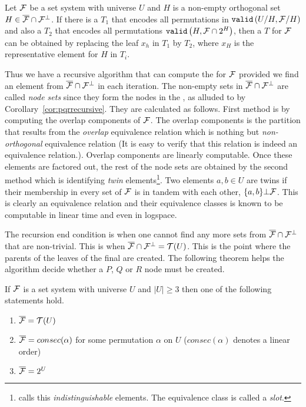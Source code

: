 \begin{corollary}[{\cite[Cor.~8]{mm96}}]
  \label{cor:pqrrecursive}
  Let ${\cal F}$ be a set system with universe $U$ and $H$ is a non-empty
  orthogonal set $H \in \overline{{\cal F}} \cap {\cal F}^{\bot}$. If there is a \PQRtree $T_1$ that
  encodes all permutations in ${\tt valid}\left(U/H, {\cal F}/H\right)$ and also a \PQRtree
  $T_2$ that encodes all permutations ${\tt valid}\left(H,{\cal F} \cap 2^{H}\right)$,
  then a \PQRtree $T$ for ${\cal F}$ can be obtained by replacing the leaf
  $x_h$ in $T_1$ by $T_2$, where $x_H$ is the representative element for
  $H$ in $T_i$.
\end{corollary}


Thus we have a recursive algorithm that can compute the \PQRtree for
${\cal F}$ provided we find an element from $\overline{{\cal F}} \cap {\cal F}^{\bot}$ in each iteration. The
non-empty sets in $\overline{{\cal F}} \cap {\cal F}^{\bot}$ are called {\em node sets} since they form the
nodes in the \PQRtree, as alluded to by
Corollary~\ref{cor:pqrrecursive}. They are calculated as follows.
First method is by computing the overlap components of ${\cal F}$. The
overlap components is the partition that results from the {\em
  overlap} equivalence relation which is nothing but {\em
  non-orthogonal} equivalence relation (It is easy to verify
  that this relation is indeed an equivalence relation.). Overlap
components are linearly computable\cite{mm95,wlh92}. Once these
elements are factored out, the rest of the node sets are obtained by
the second method which is identifying {\em twin}
elements\footnote{\cite[Sec.~3]{kklv10} calls this {\em indistinguishable}
  elements. The equivalence class is called a {\em slot}.}. Two
elements $a, b \in U$ are twins if their membership in every set of
${\cal F}$ is in tandem with each other, \ie $\{a,b\} \bot {\cal F}$. This is
clearly an equivalence relation and their equivalence classes is known
to be computable in linear time\cite{wlh01} and even in
logspace\cite{kklv10}.

The recursion end condition is when one cannot find any more sets from
$\overline{{\cal F}} \cap {\cal F}^{\bot}$ that are non-trivial. This is when $\overline{{\cal F}} \cap {\cal F}^{\bot} = {\cal T}(U)$. This is the
point where the parents of the leaves of the final \PQRtree are created. The
following theorem helps the algorithm decide whether a $P$, $Q$ or
$R$ node must be created.

\begin{theoremsansproof}[{\cite[Th.~9]{mm96}}] %
\label{th:pqrfinalmm}
If ${\cal F}$ is a set system with universe $U$ and $|U| \ge 3$ then one of
the following statements hold.
\begin{enumerate}
\item \label{th::it1} $\overline{{\cal F}} = {\cal T}(U)$ 
\item \label{th::it2}$\overline{{\cal F}} = consec(\alpha)$ for
  some permutation $\alpha$ on $U$ ($consec(\alpha)$ denotes a linear order)
\item \label{th::it3}$\overline{{\cal F}} = 2^{U}$ 
\end{enumerate}
\end{theoremsansproof}

